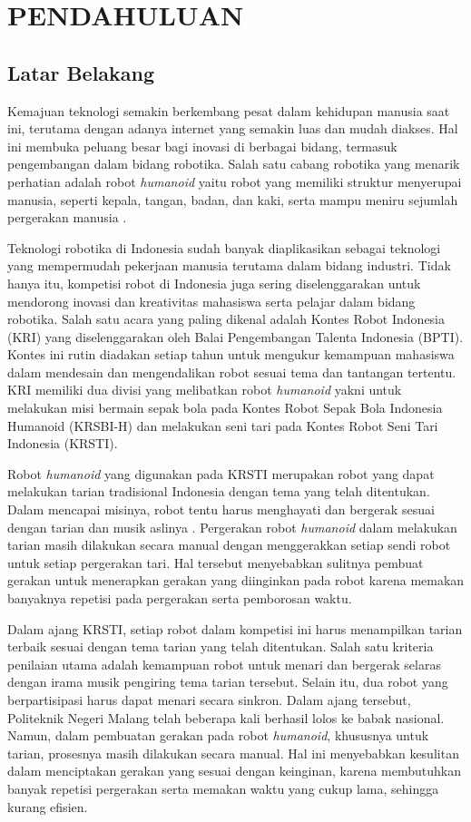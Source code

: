 \chapter{PENDAHULUAN}
\vspace{1em}

\section{Latar Belakang}
Kemajuan teknologi semakin berkembang pesat dalam kehidupan manusia saat ini, terutama dengan adanya internet yang semakin luas dan mudah diakses. Hal ini membuka peluang besar bagi inovasi di berbagai bidang, termasuk pengembangan dalam bidang robotika. Salah satu cabang robotika yang menarik perhatian adalah robot \textit{humanoid} yaitu robot yang memiliki struktur menyerupai manusia, seperti kepala, tangan, badan, dan kaki, serta mampu meniru sejumlah pergerakan manusia \cite{jalil2016rancang}.

Teknologi robotika di Indonesia sudah banyak diaplikasikan sebagai teknologi yang mempermudah pekerjaan manusia terutama dalam bidang industri. Tidak hanya itu, kompetisi robot di Indonesia juga sering diselenggarakan untuk mendorong inovasi dan kreativitas mahasiswa serta pelajar dalam bidang robotika. Salah satu acara yang paling dikenal adalah Kontes Robot Indonesia (KRI) yang diselenggarakan oleh Balai Pengembangan Talenta Indonesia (BPTI). Kontes ini rutin diadakan setiap tahun untuk mengukur kemampuan mahasiswa dalam mendesain dan mengendalikan robot sesuai tema dan tantangan tertentu. KRI memiliki dua divisi yang melibatkan robot \textit{humanoid} yakni untuk melakukan misi bermain sepak bola pada Kontes Robot Sepak Bola Indonesia Humanoid (KRSBI-H) dan melakukan seni tari pada Kontes Robot Seni Tari Indonesia (KRSTI).

Robot \textit{humanoid} yang digunakan pada KRSTI merupakan robot yang dapat melakukan tarian tradisional Indonesia dengan tema yang telah ditentukan. Dalam mencapai misinya, robot tentu harus menghayati dan bergerak sesuai dengan tarian dan musik aslinya . Pergerakan robot \textit{humanoid} dalam melakukan tarian masih dilakukan secara manual dengan menggerakkan setiap sendi robot untuk setiap pergerakan tari. Hal tersebut menyebabkan sulitnya pembuat gerakan untuk menerapkan gerakan yang diinginkan pada robot karena memakan banyaknya repetisi pada pergerakan serta pemborosan waktu.

Dalam ajang KRSTI, setiap robot dalam kompetisi ini harus menampilkan tarian terbaik sesuai dengan tema tarian yang telah ditentukan. Salah satu kriteria penilaian utama adalah kemampuan robot untuk menari dan bergerak selaras dengan irama musik pengiring tema tarian tersebut. Selain itu, dua robot yang berpartisipasi harus dapat menari secara sinkron. Dalam ajang tersebut, Politeknik Negeri Malang telah beberapa kali berhasil lolos ke babak nasional. Namun, dalam pembuatan gerakan pada robot \textit{humanoid}, khususnya untuk tarian, prosesnya masih dilakukan secara manual. Hal ini menyebabkan kesulitan dalam menciptakan gerakan yang sesuai dengan keinginan, karena membutuhkan banyak repetisi pergerakan serta memakan waktu yang cukup lama, sehingga kurang efisien.

